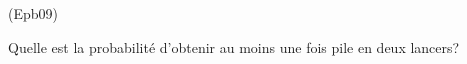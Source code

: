 \begin{tiny}(Epb09)\end{tiny} Quelle est la probabilité d'obtenir au moins une fois pile en deux lancers? 